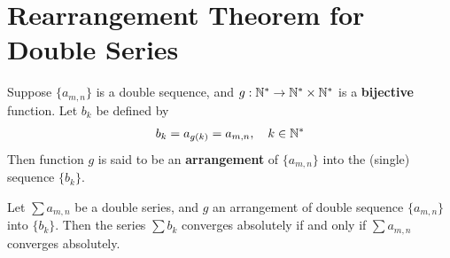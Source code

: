 \documentclass[thmcnt=section, 12pt]{my-elegantbook}
\begin{document}

\section{Rearrangement Theorem for Double Series}

\begin{definition}
    Suppose $\{a_{m,n}\}$ is a double sequence, and $g: \mathbb{N}^\ast \to \mathbb{N}^\ast \times \mathbb{N}^\ast$ is a \textbf{bijective} function. Let $b_k$ be defined by 
    \begin{align*}
        b_k = a_{g(k)} = a_{m, n},
        \quad k \in \mathbb{N}^\ast
    \end{align*}
    Then function $g$ is said to be an \textbf{arrangement} of $\{a_{m,n}\}$ into the (single) sequence $\{b_k\}$.
\end{definition}


\begin{lemma} \label{lem:4}
    Let $\sum a_{m,n}$ be a double series, and $g$ an arrangement of double sequence $\{a_{m,n}\}$ into $\{b_k\}$. Then the series $\sum b_k$ converges absolutely if and only if $\sum a_{m,n}$ converges absolutely.
\end{lemma}
\end{document}
